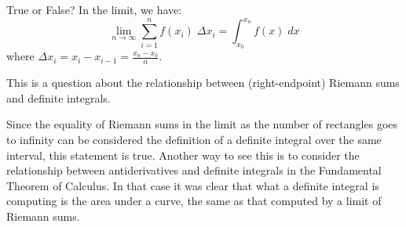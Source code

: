 \documentclass{ximera}
\author{Emma Smith Zbarsky}
\begin{document}
\begin{exercise}

True or False? In the limit, we have:
\[\lim_{n\to \infty} \sum_{i=1}^n f(x_i) \; \Delta x_i = \int_{x_0}^{x_n} f(x) \; dx\]
where $\Delta x_i = x_i-x_{i-1} = \frac{x_n-x_0}{n}.$


\begin{hint}
This is a question about the relationship between (right-endpoint)
Riemann sums and definite integrals.
\end{hint}


\begin{hint}
Since the equality of Riemann sums in the limit as the number of
rectangles goes to infinity can be considered the definition of a
definite integral over the same interval, this statement is true.
Another way to see this is to consider the relationship between
antiderivatives and definite integrals in the Fundamental Theorem of
Calculus. In that case it was clear that what a definite integral is
computing is the area under a curve, the same as that computed by a
limit of Riemann sums.
\end{hint}


\begin{multipleChoice}
\end{multipleChoice}

\end{exercise}
\end{document}
